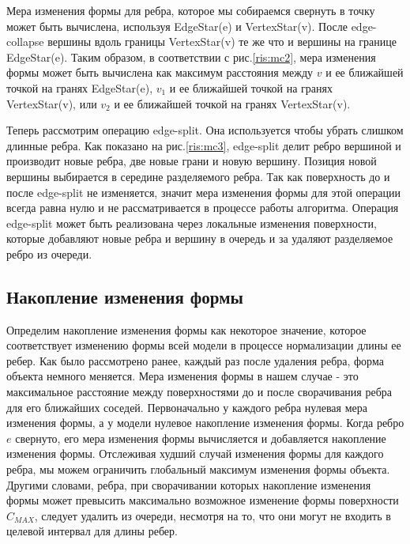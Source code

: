 \documentclass[14pt]{article}
\numberwithin{figure}{section}
\numberwithin{equation}{section}
\begin{document}
Мера изменения формы для ребра, которое мы собираемся свернуть в точку может быть вычислена, используя EdgeStar(e) и VertexStar(v). После edge-collapse вершины вдоль границы VertexStar(v) те же что и вершины на границе EdgeStar(e). Таким образом, в соответствии с рис.\ref{ris:mc2}, мера изменения формы может быть вычислена как максимум расстояния между $v$ и ее ближайшей точкой на гранях EdgeStar(e), $v_1$ и ее ближайшей точкой на гранях VertexStar(v), или $v_2$ и ее ближайшей точкой на гранях VertexStar(v).


Теперь рассмотрим операцию edge-split. Она используется чтобы убрать слишком длинные ребра. Как показано на рис.\ref{ris:mc3}, edge-split делит ребро вершиной и производит новые ребра, две новые грани и новую вершину. Позиция новой вершины выбирается в середине разделяемого ребра. Так как поверхность до и после edge-split не изменяется, значит мера изменения формы для этой операции всегда равна нулю и не рассматривается в процессе работы алгоритма. Операция edge-split может быть реализована через локальные изменения поверхности, которые добавляют новые ребра и вершину в очередь и за удаляют разделяемое ребро из очереди.

\subsection{Накопление изменения формы}

Определим накопление изменения формы как некоторое значение, которое соответствует изменению формы всей модели в процессе нормализации длины ее ребер. Как было рассмотрено ранее, каждый раз после удаления ребра, форма объекта немного меняется. Мера изменения формы в нашем случае - это максимальное расстояние между поверхностями до и после сворачивания ребра для его ближайших соседей.
Первоначально у каждого ребра нулевая мера изменения формы, а у модели нулевое накопление изменения формы. Когда ребро $e$ свернуто, его мера изменения формы вычисляется и добавляется накопление изменения формы. Отслеживая худший случай изменения формы для каждого ребра, мы можем ограничить глобальный максимум изменения формы объекта. Другими словами, ребра, при сворачивании которых накопление изменения формы может превысить максимально возможное изменение формы поверхности $C_{MAX}$, следует удалить из очереди, несмотря на то, что они могут не входить в целевой интервал для длины ребер.
\end{document}
